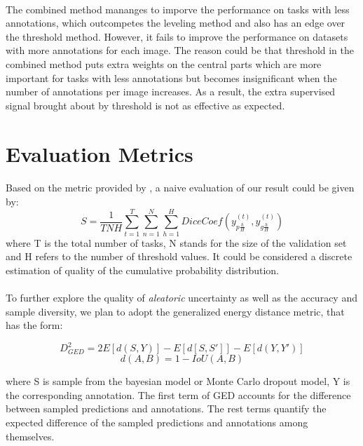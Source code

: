 \documentclass[12pt]{extarticle}
\begin{document}
\paragraph{}
The combined method mananges to imporve the performance on tasks with less annotations, which outcompetes the leveling method and also has 
an edge over the threshold method. However, it fails to improve the performance on datasets with 
more annotations for each image. The reason could be that threshold in the combined method puts extra 
weights on the central parts which are more important for tasks with less annotations but becomes insignificant when
the number of annotations per image increases. As a result, the extra supervised signal brought about by threshold 
is not as effective as expected.

\section{Evaluation Metrics}
\paragraph{}
Based on the metric provided by \cite{qubiq}, a naive evaluation of our result could be given by:
\begin{equation}
    S = \frac{1}{TNH}\sum_{t=1}^{T}\sum_{n=1}^{N}\sum_{h=1}^{H}DiceCoef(y_{p\frac{h}{H}}^{(t)}, y_{g\frac{h}{H}}^{(t)})
\end{equation}
where T is the total number of tasks, N stands for the size of the validation set and H refers to the number of threshold values. It could be considered a discrete estimation of quality of the cumulative probability distribution.

\paragraph{}
To further explore the quality of \textit{aleatoric} uncertainty as well as the accuracy and sample diversity, we plan to 
adopt the generalized energy distance metric, that has the form:

\begin{equation}
    D^2_{GED} = 2E[d(S, Y)] - E[d[S, S']] - E[d(Y, Y')]
\end{equation}
\begin{equation}
    d(A, B) = 1 - IoU(A, B)
\end{equation}

where S is sample from the bayesian model or Monte Carlo dropout model, Y is the corresponding 
annotation. The first term of GED accounts for the difference between sampled predictions
and annotations. The rest terms quantify the expected difference of the sampled predictions and 
annotations among themselves. 
\end{document}
